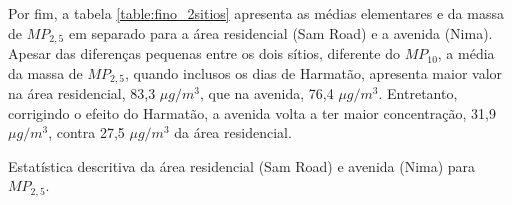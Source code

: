 Por fim, a tabela \ref{table:fino_2sitios} apresenta as médias elementares e
da massa de $MP_{2,5}$ em separado para a área residencial (Sam Road) e
a avenida (Nima). Apesar das diferenças pequenas entre os dois sítios, 
diferente do $MP_{10}$, a média da massa de $MP_{2,5}$, quando inclusos os dias
de Harmatão, apresenta maior valor na área residencial, 83,3 $\mu g / m^3$,
que na avenida, 76,4 $\mu g / m^3$. Entretanto, corrigindo o efeito do Harmatão,
a avenida volta a ter maior concentração, 31,9 $\mu g / m^3$, contra 27,5 
$\mu g / m^3$  da área residencial.

\begin{table}[H]
  \centering
  \caption{Estatística descritiva da área residencial (Sam Road) e avenida (Nima) 
           para $MP_{2,5}$. \label{table:fino_2sitios}}
    
\end{table}
